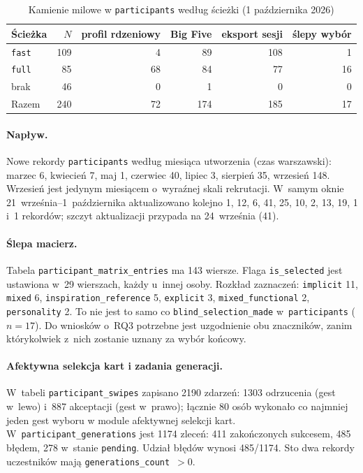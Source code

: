 \begin{table}[ht]
  \centering
  \caption{Kamienie milowe w \texttt{participants} według ścieżki (1 października 2026)}
  \label{tab:ch08:path-2026-10-01}
  \begin{tabular}{lrrrrr}
    \toprule
    Ścieżka & $N$ & profil rdzeniowy & Big Five & eksport sesji & ślepy wybór \\
    \midrule
    \texttt{fast} & 109 & 4 & 89 & 108 & 1 \\
    \texttt{full} & 85 & 68 & 84 & 77 & 16 \\
    brak & 46 & 0 & 1 & 0 & 0 \\
    \midrule
    Razem & 240 & 72 & 174 & 185 & 17 \\
    \bottomrule
  \end{tabular}
\end{table}

\paragraph{Napływ.}
Nowe rekordy \texttt{participants} według miesiąca utworzenia (czas warszawski): marzec 6, kwiecień 7, maj 1, czerwiec 40, lipiec 3, sierpień 35, wrzesień 148. Wrzesień jest jedynym miesiącem o~wyraźnej skali rekrutacji. W~samym oknie 21~września--1~października aktualizowano kolejno 1, 12, 6, 41, 25, 10, 2, 13, 19, 1 i~1 rekordów; szczyt aktualizacji przypada na 24~września (41).

\paragraph{Ślepa macierz.}
Tabela \texttt{participant\_matrix\_entries} ma 143 wiersze. Flaga \texttt{is\_selected} jest ustawiona w~29 wierszach, każdy u~innej osoby. Rozkład zaznaczeń: \texttt{implicit} 11, \texttt{mixed} 6, \texttt{inspiration\_reference} 5, \texttt{explicit} 3, \allowbreak\texttt{mixed\_functional} 2, \texttt{personality} 2. To nie jest to samo co \allowbreak\texttt{blind\_selection\_made} w~\texttt{participants} ($n=17$). Do wniosków o~RQ3 potrzebne jest uzgodnienie obu znaczników, zanim którykolwiek z~nich zostanie uznany za wybór końcowy.

\paragraph{Afektywna selekcja kart i zadania generacji.}
W~tabeli \texttt{participant\_swipes} zapisano 2190 zdarzeń: 1303 odrzucenia (gest w~lewo) i~887 akceptacji (gest w~prawo); łącznie 80 osób wykonało co najmniej jeden gest wyboru w module afektywnej selekcji kart. W~\texttt{participant\_generations} jest 1174 zleceń: 411 zakończonych sukcesem, 485 błędem, 278 w~stanie \texttt{pending}. Udział błędów wynosi 485/1174. Sto dwa rekordy uczestników mają \texttt{generations\_count}~$>0$.

